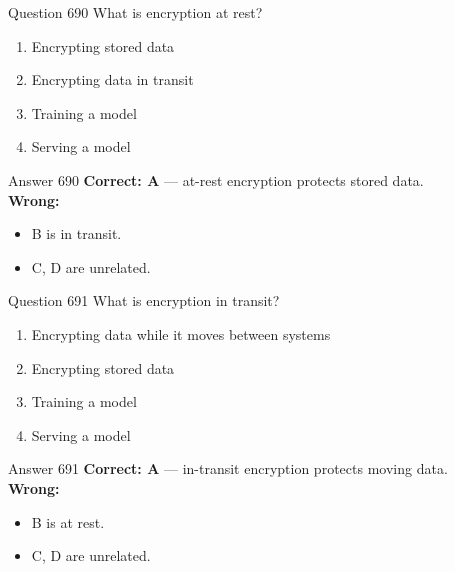 \documentclass[aspectratio=169,11pt]{beamer}
\begin{document}
	\begin{frame}{Question 690}
		What is encryption at rest?
		\begin{enumerate}[label=\Alph*.]
			\item Encrypting stored data
			\item Encrypting data in transit
			\item Training a model
			\item Serving a model
		\end{enumerate}
	\end{frame}
	\begin{frame}{Answer 690}
		\textbf{Correct: A} --- at-rest encryption protects stored data.\\
		\vspace{0.5em}
		\textbf{Wrong:}
		\begin{itemize}
			\item B is in transit.
			\item C, D are unrelated.
		\end{itemize}
	\end{frame}
	
	\begin{frame}{Question 691}
		What is encryption in transit?
		\begin{enumerate}[label=\Alph*.]
			\item Encrypting data while it moves between systems
			\item Encrypting stored data
			\item Training a model
			\item Serving a model
		\end{enumerate}
	\end{frame}
	\begin{frame}{Answer 691}
		\textbf{Correct: A} --- in-transit encryption protects moving data.\\
		\vspace{0.5em}
		\textbf{Wrong:}
		\begin{itemize}
			\item B is at rest.
			\item C, D are unrelated.
		\end{itemize}
	\end{frame}
	
\end{document}
